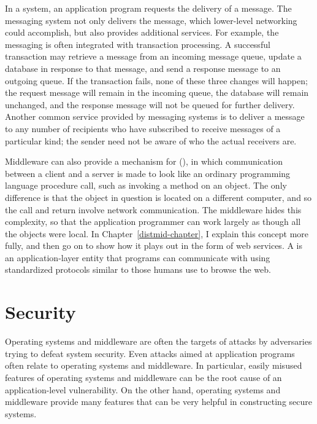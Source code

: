 In a  system, an application program requests the
delivery of a message.  The messaging system not only delivers the
message, which lower-level networking could accomplish, but also
provides additional services.  For example, the messaging is often
integrated with transaction processing.  A successful transaction may
retrieve a message from an incoming message queue, update a database in
response to that message, and send a response message to an outgoing
queue.  If the transaction fails, none of these three changes will
happen; the request message will remain in the incoming queue, the
database will remain unchanged, and the response message will not be
queued for further delivery.  Another common service provided by
messaging systems is to deliver a message to any number of recipients
who have subscribed to receive messages of a particular kind;  the
sender need not be aware of who the actual receivers are.

Middleware can also provide a mechanism for  (), in which communication between a client and a
server is made to look like an ordinary programming language procedure
call, such as invoking a method on an object.  The only difference is
that the object in question is located on a different computer, and so
the call and return involve network communication.  The middleware
hides this complexity, so that the application programmer can work
largely as though all the objects were local.  In
Chapter~\ref{distmid-chapter}, I explain this concept more fully, and then go
on to show how it plays out in the form of web services.  A  is an application-layer entity that programs can
communicate with using standardized protocols similar to those humans
use to browse the web.

\section{Security}\label{intro-security-section}

Operating systems and middleware are often the targets of attacks by
adversaries trying to defeat system security.  Even attacks aimed at
application programs often relate to operating systems and middleware.
In particular, easily misused features of operating systems and
middleware can be the root cause of an application-level
vulnerability.  On the other hand, operating systems and middleware
provide many features that can be very helpful in constructing secure
systems.

